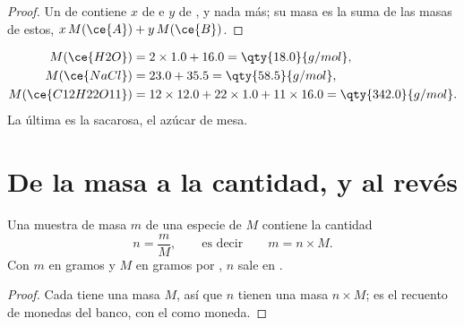 \begin{proof}
Un  de   contiene $x$  de   e
$y$  de  , y nada más; su masa es la suma de las masas
de estos, $x\,M(\ce{A}) + y\,M(\ce{B})$.
\end{proof}

\begin{example}\label{ex:g10:the-mole:three}
\begin{align*}
  M(\ce{H2O}) &= 2 \times 1.0 + 16.0 = \qty{18.0}{g/mol},\\
  M(\ce{NaCl}) &= 23.0 + 35.5 = \qty{58.5}{g/mol},\\
  M(\ce{C12H22O11}) &= 12 \times 12.0 + 22 \times 1.0 + 11 \times 16.0
     = \qty{342.0}{g/mol}.
\end{align*}
La última es la sacarosa, el azúcar de mesa.
\end{example}

\section{De la masa a la cantidad, y al revés}

\begin{proposition}\label{prop:g10:the-mole:mass}
Una muestra de masa $m$ de una especie de  $M$ contiene la
cantidad
\[
  n = \frac{m}{M}, \qquad\text{es decir}\qquad m = n \times M .
\]
Con $m$ en gramos y $M$ en gramos por , $n$ sale en .
\end{proposition}

\begin{proof}
Cada  tiene una masa $M$, así que $n$  tienen una masa
$n \times M$; es el recuento de monedas del banco, con el  como
moneda.
\end{proof}

